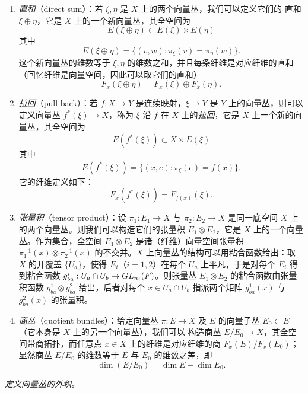 \begin{enumerate}[label=\arabic*.]
\item \emph{直和}（direct sum）：若 $\xi,\eta$ 是 $X$ 上的两个向量丛，我们可以定义它们的
直和 $\xi\oplus\eta$，它是 $X$ 上的一个新向量丛，其全空间为
\[ E(\xi\oplus\eta)\subset E(\xi)\times E(\eta) \]
其中
\[ E(\xi\oplus\eta)=\{(v,w) : \pi_\xi(v)=\pi_\eta(w)\}. \]
这个新向量丛的维数等于 $\xi,\eta$ 的维数之和，并且每条纤维是对应纤维的直和（回忆纤维是向量空间，因此可以取它们的直和）
\[ F_x(\xi\oplus\eta)=F_x(\xi)\oplus F_x(\eta). \]

\item \emph{拉回}（pull-back）：若 $f: X\to Y$ 是连续映射，$\xi\to Y$ 是 $Y$ 上的向量丛，则可以定义向量丛 $f^*(\xi)\to X$，称为 $\xi$ 沿 $f$ 在 $X$ 上的\emph{拉回}，它是 $X$ 上一个新的向量丛，其全空间为
\[ E(f^*(\xi))\subset X\times E(\xi) \]
其中
\[ E(f^*(\xi))=\{(x,e) : \pi_\xi(e)=f(x)\}. \]
它的纤维定义如下：
\[ F_x(f^*(\xi))=F_{f(x)}(\xi). \]

\item \emph{张量积}（tensor product）：设 $\pi_1: E_1\to X$ 与 $\pi_2: E_2\to X$ 是同一底空间 $X$ 上的两个向量丛。则我们可以构造它们的张量积 $E_1\otimes E_2$，它是 $X$ 上的一个向量丛。作为集合，全空间 $E_1\otimes E_2$ 是诸（纤维）向量空间张量积 $\pi_1^{-1}(x)\otimes\pi_2^{-1}(x)$ 的不交并。$X$ 上向量丛的结构可以用粘合函数给出：取 $X$ 的开覆盖 $\{U_a\}$，使得 $E_i$（$i=1,2$）在每个 $U_a$ 上平凡，于是对每个 $E_i$ 得到粘合函数 $g^i_{ba}: U_a\cap U_b\to GL_{n_i}(F)$。则张量丛 $E_1\otimes E_2$ 的粘合函数由张量积函数 $g^1_{ba}\otimes g^2_{ba}$ 给出，后者对每个 $x\in U_a\cap U_b$ 指派两个矩阵 $g^1_{ba}(x)$ 与 $g^2_{ba}(x)$ 的张量积。


\item \emph{商丛}（quotient bundles）：给定向量丛 $\pi: E\to X$ 及 $E$ 的向量子丛 $E_0\subset E$（它本身是 $X$ 上的另一个向量丛），我们可以
构造商丛 $E/E_0\to X$，其全空间带商拓扑，而任意点 $x\in X$ 上的纤维是对应纤维的商 $F_x(E)/F_x(E_0)$；显然商丛 $E/E_0$ 的维数等于 $E$ 与 $E_0$ 的维数之差，即
\[ \dim(E/E_0)=\dim E-\dim E_0. \]
\end{enumerate}

 \emph{定义向量丛的外积。}

